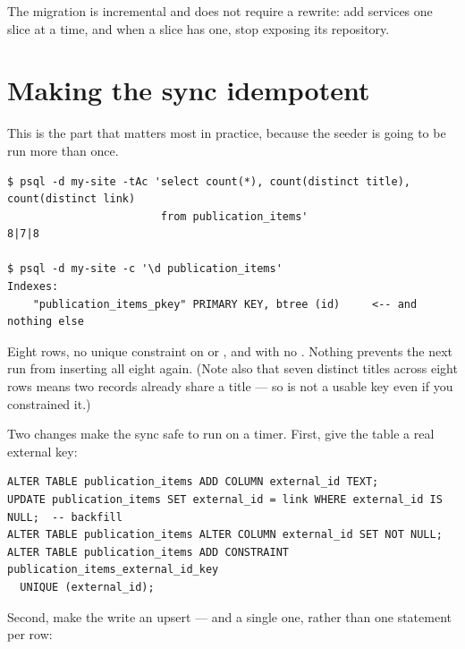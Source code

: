The migration is incremental and does not require a rewrite: add services one slice at a time, and
when a slice has one, stop exposing its repository.

\section{Making the sync idempotent}
\label{sec:idempotent}

This is the part that matters most in practice, because the seeder is going to be run more than once.

\begin{verified}
\begin{lstlisting}[style=out]
$ psql -d my-site -tAc 'select count(*), count(distinct title), count(distinct link)
                        from publication_items'
8|7|8

$ psql -d my-site -c '\d publication_items'
Indexes:
    "publication_items_pkey" PRIMARY KEY, btree (id)     <-- and nothing else
\end{lstlisting}
Eight rows, no unique constraint on  or , and
 with no . Nothing prevents the next run from
inserting all eight again. (Note also that seven distinct titles across eight rows means two records
already share a title --- so  is not a usable key even if you constrained it.)
\end{verified}

Two changes make the sync safe to run on a timer. First, give the table a real external key:

\begin{lstlisting}[style=sql]
ALTER TABLE publication_items ADD COLUMN external_id TEXT;
UPDATE publication_items SET external_id = link WHERE external_id IS NULL;  -- backfill
ALTER TABLE publication_items ALTER COLUMN external_id SET NOT NULL;
ALTER TABLE publication_items ADD CONSTRAINT publication_items_external_id_key
  UNIQUE (external_id);
\end{lstlisting}

Second, make the write an upsert --- and a single one, rather than one statement per row:

